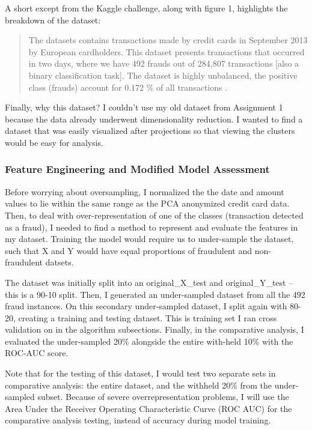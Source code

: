 \documentclass[a4paper]{article}
\begin{document}
A short except from the Kaggle challenge, along with figure 1, highlights the breakdown of the dataset:

\begin{quote}
The datasets contains transactions made by credit cards in September 2013 by European cardholders. This dataset presents transactions that occurred in two days, where we have 492 frauds out of 284,807 transactions [also a binary classification task]. The dataset is highly unbalanced, the positive class (frauds) account for 0.172 \% of all transactions \autocite{Kaggle-CreditCard}.
\end{quote}

Finally, why this dataset? I couldn't use my old dataset from Assignment 1 because the data already underwent dimensionality reduction. I wanted to find a dataset that was easily visualized after projections so that viewing the clusters would be easy for analysis.

\subsubsection{Feature Engineering and Modified Model Assessment}
Before worrying about oversampling, I normalized the the date and amount values to lie within the same range as the PCA anonymized credit card data. Then, to deal with over-representation of one of the classes (transaction detected as a fraud), I needed to find a method to represent and evaluate the features in my dataset. Training the model would require us to under-sample the dataset, such that X and Y would have equal proportions of fraudulent and non-fraudulent datsets. 

The dataset was initially split into an original\_X\_test and original\_Y\_test -- this is a 90-10 split. Then, I generated an under-sampled dataset from all the 492 fraud instances. On this secondary under-sampled dataset, I split again with 80-20, creating a training and testing dataset. This is training set I ran cross validation on in the algorithm subsections. Finally, in the comparative analysis, I evaluated the under-sampled 20\% alongside the entire with-held 10\% with the ROC-AUC score.

Note that for the testing of this dataset, I would test two separate sets in comparative analysis: the entire dataset, and the withheld 20\% from the under-sampled subset. Because of severe overrepresentation problems, I will use the Area Under the Receiver Operating Characteristic Curve (ROC AUC) for the comparative analysis testing, instead of accuracy during model training.
\end{document}
